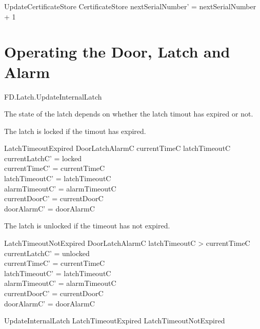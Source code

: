 \begin{schema}{UpdateCertificateStore}
        \Delta CertificateStore
\where
        nextSerialNumber' = nextSerialNumber + 1
\end{schema}

\section{Operating the Door, Latch and Alarm}

\begin{traceunit}{FD.Latch.UpdateInternalLatch}
\end{traceunit}

The state of the latch depends on whether the latch timout has expired
or not. 

The latch is locked if the timout has expired.

\begin{schema}{LatchTimeoutExpired}
        \Delta DoorLatchAlarmC
\where
        currentTimeC \geq latchTimeoutC
\also
        currentLatchC' = locked
\\      currentTimeC'  = currentTimeC
\\      latchTimeoutC' = latchTimeoutC
\\      alarmTimeoutC' = alarmTimeoutC 
\\      currentDoorC' = currentDoorC
\\      doorAlarmC' = doorAlarmC
\end{schema}

The latch is unlocked if the timeout has not expired.

\begin{schema}{LatchTimeoutNotExpired}
        \Delta DoorLatchAlarmC
\where
        latchTimeoutC > currentTimeC
\also
        currentLatchC' = unlocked
\\      currentTimeC'  = currentTimeC
\\      latchTimeoutC' = latchTimeoutC
\\      alarmTimeoutC' = alarmTimeoutC 
\\      currentDoorC' = currentDoorC
\\      doorAlarmC' = doorAlarmC
\end{schema}

\begin{zed}
        UpdateInternalLatch  LatchTimeoutExpired \lor
        LatchTimeoutNotExpired
\end{zed}


